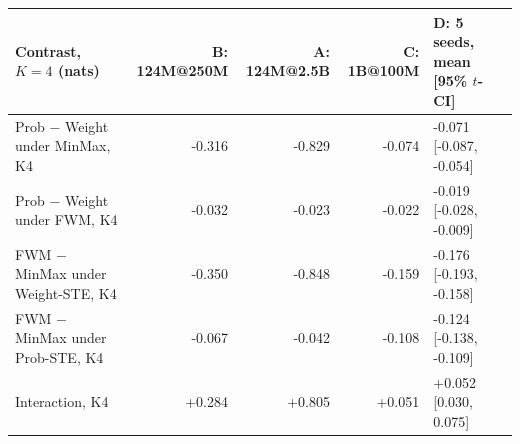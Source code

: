 \begin{tabular}{lrrrl}
\toprule
Contrast, $K{=}4$ (nats) & B: 124M@250M & A: 124M@2.5B & C: 1B@100M & D: 5 seeds, mean [95\% $t$-CI] \\
\midrule
Prob $-$ Weight under MinMax, K4 & -0.316 & -0.829 & -0.074 & -0.071 [-0.087, -0.054] \\
Prob $-$ Weight under FWM, K4 & -0.032 & -0.023 & -0.022 & -0.019 [-0.028, -0.009] \\
FWM $-$ MinMax under Weight-STE, K4 & -0.350 & -0.848 & -0.159 & -0.176 [-0.193, -0.158] \\
FWM $-$ MinMax under Prob-STE, K4 & -0.067 & -0.042 & -0.108 & -0.124 [-0.138, -0.109] \\
Interaction, K4 & +0.284 & +0.805 & +0.051 & +0.052 [0.030, 0.075] \\
\bottomrule
\end{tabular}
